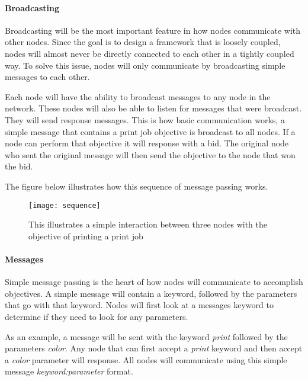 \paragraph{Broadcasting}
Broadcasting will be the most important feature in how nodes communicate with other nodes. Since the goal is to design a framework that is loosely coupled, nodes will almost never be directly connected to each other in a tightly coupled way. To solve this issue, nodes will only communicate by broadcasting simple messages to each other.

Each node will have the ability to broadcast messages to any node in the network. These nodes will also be able to listen for messages that were broadcast. They will send response messages. This is how basic communication works, a simple message that contains a print job objective is broadcast to all nodes. If a node can perform that objective it will response with a bid. The original node who sent the original message will then send the objective to the node that won the bid. 

The figure below illustrates how this sequence of message passing works.

\begin{figure}[H]
\centering
	\texttt{[image: sequence]}
	\captionsetup{justification=centering}
    \caption{This illustrates a simple interaction between three nodes with the objective of printing a print job}
\end{figure}

\paragraph{Messages}
Simple message passing is the heart of how nodes will communicate to accomplish objectives. A simple message will contain a keyword, followed by the parameters that go with that keyword. Nodes will first look at a messages keyword to determine if they need to look for any parameters. 

As an example, a message will be sent with the keyword \textit{print} followed by the parameters \textit{color}. Any node that can first accept a \textit{print} keyword and then accept a \textit{color} parameter will response. All nodes will communicate using this simple message  \textit{keyword:parameter} format. 

